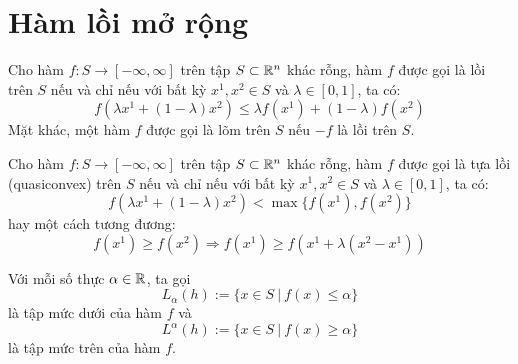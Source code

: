 \section{Hàm lồi mở rộng}
\begin{dn}
Cho hàm $f: S \rightarrow [-\infty, \infty]$ trên tập $S \subset \mathbb{R} ^n$ khác rỗng, hàm $f$ được gọi là lồi trên $S$ nếu và chỉ nếu với bất kỳ $x^1, x^2 \in S$ và $\lambda \in [0,1]$, ta có:
\begin{equation*}
    f(\lambda x^1 +(1-\lambda) x^2) \leq \lambda f(x^1) + (1 - \lambda) f(x^2)
\end{equation*}
Mặt khác, một hàm $f$ được gọi là lõm trên $S$ nếu $-f$ là lồi trên $S$.
\end{dn}
\begin{dn}
    Cho hàm $f: S \rightarrow [-\infty, \infty]$ trên tập $S \subset \mathbb{R} ^n$ khác rỗng, hàm $f$ được gọi là tựa lồi (quasiconvex) trên $S$ nếu và chỉ nếu với bất kỳ $x^1, x^2 \in S$ và $\lambda \in [0,1]$, ta có:
    \begin{equation*}
         f(\lambda x^1 + (1 - \lambda)x^2) < \max \{f(x^1), f(x^2)\}
     \end{equation*}
     hay một cách tương đương:
     \begin{equation*}
          f(x^1) \geq f(x^2) \Rightarrow f(x^1) \geq f(x^1 + \lambda(x^2 - x^1))
     \end{equation*}
\end{dn}

\begin{dn}
    Với mỗi số thực $\alpha \in \mathbb{R}$, ta gọi
    $$ L_\alpha(h) := \{x \in S\ |\ f(x) \leq \alpha \} $$
    là tập mức dưới của hàm $f$ và
    $$ L^\alpha(h) := \{x \in S\ |\ f(x) \geq \alpha \} $$
    là tập mức trên của hàm $f$.
\end{dn}

